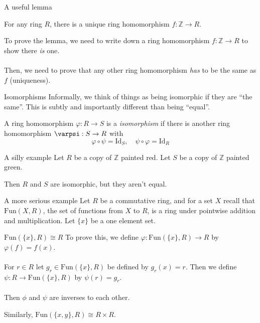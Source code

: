 \documentclass{beamer}
\newcommand{\Z}{\mathbb{Z}}
\begin{document}
\begin{frame}{A useful lemma}

  \begin{lemma} For any ring $R$, there is a unique ring homomorphism $f:\Z\to R$.
  \end{lemma}

  To prove the lemma, we need to write down a ring homomorphism $f:\Z\to R$ to show there \emph{is} one. \\~\\

  Then, we need to prove that any other ring homomorphism \emph{has} to be the same as $f$ (uniqueness).
  \end{frame}

\begin{frame}{Isomorphisms}
Informally, we think of things as being isomorphic if they are ``the same''.  This is subtly and importantly different than being ``equal''.  

\begin{definition}
A ring homomorphism $\varphi:R\to S$ is a \emph{isomorphism} if there is another ring homomorphism $\varpsi:S\to R$ with $$\varphi\circ\psi=\text{Id}_S, \quad\psi\circ\varphi=\text{Id}_R$$
  \end{definition} 

\begin{block}{A silly example}
  Let {\color{red} $R$} be a copy of {\color{red} $\Z$} painted {\color{red}red}.
  Let {\color{green}$S$} be a copy of {\color{green}$\Z$} painted {\color{green}green}.

  Then {\color{red}$R$} and {\color{green}$S$} are isomorphic, but they aren't equal.
  \end{block}

\end{frame}

\begin{frame}{A more serious example}
  Let $R$ be a commutative ring, and for a set $X$ recall that $\text{Fun}(X,R)$, the set of functions from $X$ to $R$, is a ring under pointwise addition and multiplication.  Let $\{x\}$ be a one element set.

  \begin{block}{$\text{Fun}(\{x\}, R)\cong R$} To prove this, we define $\varphi:\text{Fun}(\{x\}, R)\to R$ by $\varphi(f)=f(x)$. \\~\\

    For $r\in R$ let $g_r\in\text{Fun}(\{x\}, R)$ be defined by $g_r(x)=r$. Then we define $\psi:R\to\text{Fun}(\{x\}, R)$ by $\psi(r)=g_r$. \\~\\

    Then $\phi$ and $\psi$ are inverses to each other.
    \end{block}
  
Similarly, $\text{Fun}(\{x,y\},R)\cong R\times R$.
  \end{frame}
\end{document}
